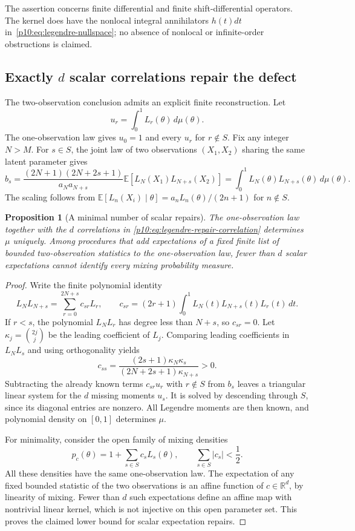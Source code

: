 \documentclass[11pt,letterpaper]{article}
\newtheorem{proposition}[theorem]{Proposition}
\theoremstyle{definition}
\theoremstyle{remark}
\newcommand{\1}{\mathbf 1}
\begin{document}
The assertion concerns finite differential and finite shift-differential
operators.  The kernel does have the nonlocal integral annihilators
$h(t)dt$ in~\eqref{p10:eq:legendre-nullspace}; no absence of nonlocal or
infinite-order obstructions is claimed.

\subsection{Exactly $d$ scalar correlations repair the defect}

The two-observation conclusion admits an explicit finite reconstruction.
Let
\[
 u_r=\int_0^1 L_r(\theta)\,d\mu(\theta).
\]
The one-observation law gives $u_0=1$ and every $u_r$ for $r\notin S$.
Fix any integer $N>M$.  For $s\in S$, the joint law of two observations
$(X_1,X_2)$ sharing the same latent parameter gives
\begin{equation}\label{p10:eq:legendre-repair-correlation}
 b_s=\frac{(2N+1)(2N+2s+1)}{a_Na_{N+s}}
             \mathbb E[L_N(X_1)L_{N+s}(X_2)]
     =\int_0^1 L_N(\theta)L_{N+s}(\theta)\,d\mu(\theta).
\end{equation}
The scaling follows from
$\mathbb E[L_n(X_i)\mid\theta]=a_nL_n(\theta)/(2n+1)$ for $n\notin S$.

\begin{proposition}[A minimal number of scalar repairs]
\label{p10:prop:legendre-minimal-repair}
The one-observation law together with the $d$ correlations in
\eqref{p10:eq:legendre-repair-correlation} determines $\mu$ uniquely.
Among procedures that add expectations of a fixed finite list of bounded
two-observation statistics to the one-observation law, fewer than $d$
scalar expectations cannot identify every mixing probability measure.
\end{proposition}

\begin{proof}
Write the finite polynomial identity
\[
 L_N L_{N+s}=\sum_{r=0}^{2N+s}c_{sr}L_r,
 \qquad
 c_{sr}=(2r+1)\int_0^1 L_N(t)L_{N+s}(t)L_r(t)\,dt.
\]
If $r<s$, the polynomial $L_NL_r$ has degree less than $N+s$, so
$c_{sr}=0$.  Let $\kappa_j=\binom{2j}{j}$ be the leading coefficient of
$L_j$.  Comparing leading coefficients in $L_NL_s$ and using
orthogonality yields
\[
 c_{ss}=\frac{(2s+1)\kappa_N\kappa_s}
                    {(2N+2s+1)\kappa_{N+s}}>0.
\]
Subtracting the already known terms $c_{sr}u_r$ with $r\notin S$ from
$b_s$ leaves a triangular linear system for the $d$ missing moments $u_s$.
It is solved by descending through $S$, since its diagonal entries are
nonzero.  All Legendre moments are then known, and polynomial density on
$[0,1]$ determines $\mu$.

For minimality, consider the open family of mixing densities
\[
 p_c(\theta)=1+\sum_{s\in S}c_sL_s(\theta),
 \qquad \sum_{s\in S}|c_s|<\frac12.
\]
All these densities have the same one-observation law.  The expectation
of any fixed bounded statistic of the two observations is an affine
function of $c\in\mathbb R^d$, by linearity of mixing.  Fewer than $d$
such expectations define an affine map with nontrivial linear kernel,
which is not injective on this open parameter set.  This proves the
claimed lower bound for scalar expectation repairs.
\end{proof}
\end{document}
